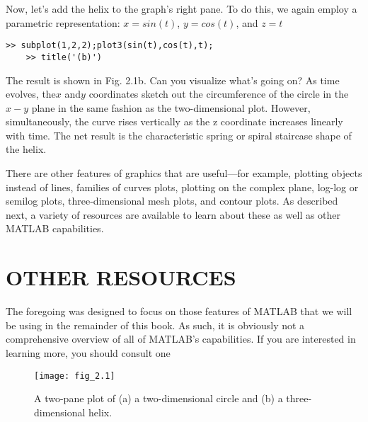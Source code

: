 \documentclass[../main.tex]{subfiles}
\begin{document}
Now, let's add the helix to the graph's right pane. To do this, we again employ a parametric representation:
 $x = sin(t)$, $y = cos(t)$, and $z = t$
 \begin{lstlisting}[frame=none, numbers=none]
	>> subplot(1,2,2);plot3(sin(t),cos(t),t);
	>> title('(b)')
\end{lstlisting}
The result is shown in Fig. 2.1b. Can you visualize what's going on? As time evolves,
the$ x$ and$ y$ coordinates sketch out the circumference of the circle in the $x-y$ plane in the
same fashion as the two-dimensional plot. However, simultaneously, the curve rises vertically as the z coordinate 
increases linearly with time. The net result is the characteristic
spring or spiral staircase shape of the helix.


There are other features of graphics that are useful—for example, plotting objects
instead of lines, families of curves plots, plotting on the complex plane, log-log or semilog
plots, three-dimensional mesh plots, and contour plots. As described next, a variety of resources are available
 to learn about these as well as other MATLAB capabilities.


\section{OTHER RESOURCES}


The foregoing was designed to focus on those features of MATLAB that we will be using
in the remainder of this book. As such, it is obviously not a comprehensive overview of all
of MATLAB's capabilities. If you are interested in learning more, you should consult one


\begin{figure}[H]
	\centering
	\texttt{[image: fig\_2.1]}
   \caption{\textsf{A two-pane plot of (a) a two-dimensional circle and (b) a three-dimensional helix. }}
   \label{fig_1.}
\end{figure}
\end{document}
